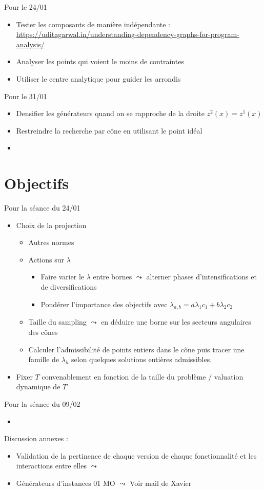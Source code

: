 Pour le 24/01
\begin{itemize}
    \item Tester les composants de manière indépendante : \url{https://uditagarwal.in/understanding-dependency-graphs-for-program-analysis/}
    \item Analyser les points qui voient le moins de contraintes
    \item Utiliser le centre analytique pour guider les arrondis
\end{itemize}
Pour le 31/01
\begin{itemize}
    \item Densifier  les générateurs quand on se rapproche de la droite $z^2(x)=z^1(x)$
    \item Restreindre la recherche par cône en utilisant le point idéal
    \item 
\end{itemize}
\section{Objectifs}
Pour la séance du 24/01
\begin{itemize}
    \item Choix de la projection
    \begin{itemize}
        \item Autres normes
        \item Actions sur $\lambda$ 
        \begin{itemize}
            \item Faire varier le $\lambda$ entre bornes $\leadsto$ alterner phases d'intensifications et de diversifications
            \item Pondérer l'importance des objectifs avec $\lambda_{a,b} = a\lambda_1 c_1  + b\lambda_2 c_2$
        \end{itemize}
        \item Taille du sampling $\leadsto$ en déduire une borne sur les secteurs angulaires des cônes
        \item Calculer l'admissibilité de points entiers dans le cône puis tracer une famille de $\lambda_h$ selon quelques solutions entières admissibles.
    \end{itemize}
    \item Fixer $T$ convenablement en fonction de la taille du problème / valuation dynamique de $T$
\end{itemize}
Pour la séance du 09/02
\begin{itemize}
    \item 
\end{itemize}
Discussion annexes :
\begin{itemize}
    \item Validation de la pertinence de chaque version de chaque fonctionnalité et les interactions entre elles  $\leadsto$~\cite{irace}
    \item Générateurs d'instances 01 MO $\leadsto$ Voir mail de Xavier
\end{itemize}

